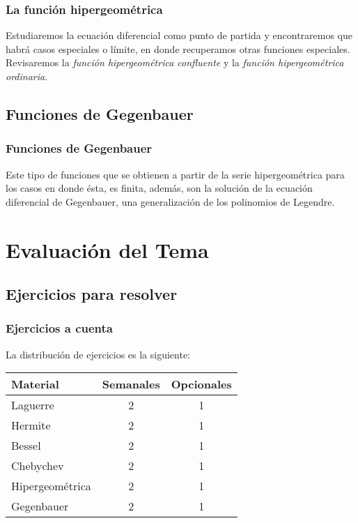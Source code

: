 \documentclass[12pt]{beamer}
\begin{document}
\begin{frame}
\frametitle{La función hipergeométrica}
Estudiaremos la ecuación diferencial como punto de partida y encontraremos que habrá casos especiales o límite, en donde recuperamos otras funciones especiales.
\\
\bigskip
Revisaremos la \emph{función hipergeométrica confluente} y la \emph{función hipergeométrica ordinaria}.
\end{frame}

\subsection{Funciones de Gegenbauer}

\begin{frame}
\frametitle{Funciones de Gegenbauer}
Este tipo de funciones que se obtienen a partir de la serie hipergeométrica para los casos en donde ésta, es finita, además, son la solución de la ecuación diferencial de Gegenbauer, una generalización de los polinomios de Legendre.
\end{frame}

\section{Evaluación del Tema}
\subsection{Ejercicios para resolver}

\begin{frame}
\frametitle{Ejercicios a cuenta}
La distribución de ejercicios es la siguiente:
\pause
\renewcommand{\arraystretch}{1.15}
\begin{table}
\centering
\begin{tabular}{l c c}
Material & Semanales & Opcionales \\ \hline
Laguerre & 2 & 1 \\ \hline
Hermite  & 2 & 1 \\ \hline
Bessel & 2 & 1 \\ \hline    
Chebychev & 2 & 1 \\ \hline    
Hipergeométrica & 2 & 1 \\ \hline
Gegenbauer & 2 & 1
\end{tabular}
\end{table}
\end{frame}
\end{document}

